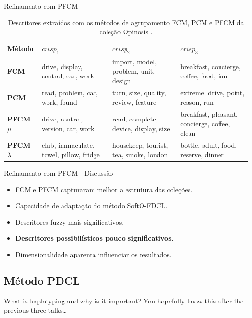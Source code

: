 \documentclass[brazil]{beamer}
\begin{document}
\begin{frame}{Refinamento com PFCM}

  \begin{table}[!htp]
    \centering
    \begin{tabular}{ |l|p{2.5cm} | p{2.5cm} | p{2.5cm}|}
      \hline
      {\bf Método} & $crisp_1$ & $crisp_2$ & $crisp_3$ \\
      \hline
      {\bf FCM} & drive, display, control, \alert{car}, work & 
      import, {\color{blue}model}, problem, unit, design & breakfast,
      {\color{green!50!black}concierge}, coffee, food, inn \\
      \hline
      {\bf PCM} & read, problem, \alert{car}, work, found & 
      turn, size, quality, review, feature & extreme, drive, point, reason, run\\
      \hline
      {\bf PFCM $\mu$} & drive, control, version, \alert{car}, work  & read, complete,
      {\color{blue}device},
      display, size & breakfast, pleasant, {\color{green!50!black}concierge}, coffee, clean \\
      \hline
      {\bf PFCM $\lambda$} & club, immaculate, towel, pillow,
      fridge & housekeep, tourist, tea, smoke, london & bottle, adult, food, reserve, dinner\\
      \hline
    \end{tabular}
    \caption{Descritores extraídos com os métodos de agrupamento FCM, PCM e PFCM da coleção Opinosis
    .}
    \label{table:pfcmdescriptors}
  \end{table}

\end{frame}

\begin{frame}{Refinamento com PFCM - Discussão}
  \begin{itemize}
    \item FCM e PFCM capturaram melhor a estrutura das coleções.
    \item Capacidade de adaptação do método SoftO-FDCL.
    \item Descritores fuzzy mais significativos.
    \item \textbf{Descritores possibilísticos pouco significativos}.
    \item Dimensionalidade aparenta influenciar os resultados.
  \end{itemize}
\end{frame}

\subsection{Método PDCL}
\begin{frame}{What is haplotyping and why is it important?}
  You hopefully know this after the previous three talks\dots
\end{frame}
\end{document}
